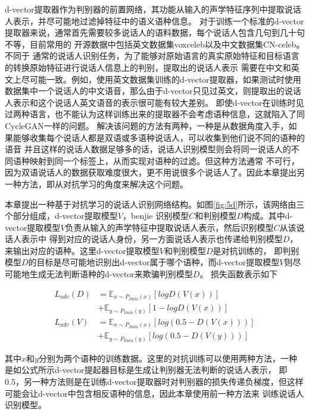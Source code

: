 d-vector提取器作为判别器的前置网络，其功能从输入的声学特征序列中提取说话人表示，并尽可能地过滤掉特征中的语义语种信息。
对于训练一个标准的d-vector提取器来说，通常首先需要较多说话人的语料数据，每个说话人包含几句到几十句不等，目前常用的
开源数据中包括英文数据集voxceleb\cite{nagrani2017voxceleb}以及中文数据集CN-celeb\cite{fan2019cn}。不同于
通常的说话人识别任务，为了能够对原始语言的真实原始特征和目标语言的转换原始特征进行说话人信息上的判别，提取出的说话人表示
需要在中文和英文上尽可能一致。例如，使用英文数据集训练的d-vector提取器，如果测试时使用
数据集中一个说话人的中文语音，那么由于d-vector只见过英文，则提取出的说话人表示和这个说话人英文语音的表示很可能有较大差别。
即使d-vector在训练时见过两种语言，也不能认为这样训练出来的提取器不会考虑语种信息，这就陷入了同CycleGAN一样的问题。
解决该问题的方法有两种，一种是从数据角度入手，如果能够收集每个说话人都是双语或多语种说话人，可以收集到他们说不同的语种的语音
并且这样的说话人数据足够多的话，说话人识别模型则会将同一说话人的不同语种映射到同一个标签上，从而实现对语种的过滤。但这种方法通常
不可行，因为双语说话人的数据获取难度很大，更不用说很多个说话人了。因此本章提出另一种方法，即从对抗学习的角度来解决这个问题。

本章提出一种基于对抗学习的说话人识别网络结构。如图\ref{fig:5d}所示，该网络由三个部分组成，d-vector提取模型$V$，benjie
识别模型$C$和判别模型$D$构成。其中d-vector提取模型$V$负责从输入的声学特征中提取说话人表示，然后识别模型$C$从该说话人表示中
得到对应的说话人身份，另一方面说话人表示也传递给判别模型$D$，来输出对应的语种。这里d-vector提取模型$V$和判别模型$D$是对抗训练的，
即判别模型$D$的目标是尽可能地识别出d-vector属于哪个语种，而d-vector提取模型$V$则尽可能地生成无法判断语种的d-vector来欺骗判别模型$D$。
损失函数表示如下


\begin{align}
    L_{adv}(D) & =\mathbb{E}_{x\sim P_{Data}(x)}\left[log D(V(x))\right] \\
               & +\mathbb{E}_{y\sim P_{Data}(y)}\left[1-log D(V(x))\right]\\
    L_{adv}(V) & =\mathbb{E}_{x\sim P_{Data}(x)}\left[log (0.5-D(V(x)))\right] \\
               & +\mathbb{E}_{y\sim P_{Data}(y)}\left[log (0.5-D(V(y)))\right]
\end{align}

其中$x$和$y$分别为两个语种的训练数据。这里的对抗训练可以使用两种方法，一种是如公式所示d-vector提起器目标是生成让判别器无法判断的说话人表示，
即0.5，另一种方法则是在训练d-vector提取器时对判别器的损失传递负梯度，但这样可能会让d-vector中包含相反语种的信息，因此本章使用前一种方法来
训练说话人识别模型。

